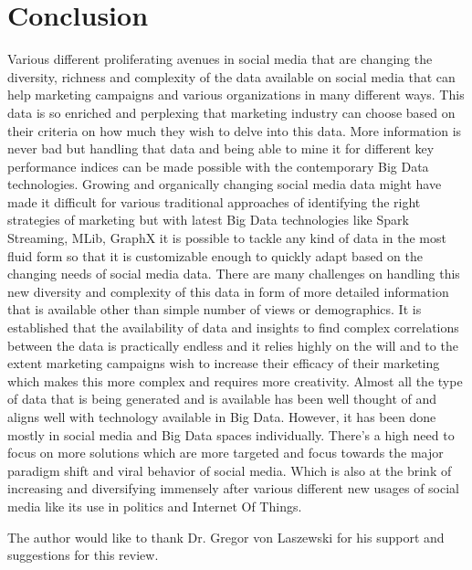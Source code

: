 \documentclass[sigconf]{acmart}
\begin{document}
\section{Conclusion}
Various different proliferating avenues in social media that are changing the diversity, richness and complexity of the data available on social media that can help marketing campaigns and various organizations in many different ways. This data is so enriched and perplexing that marketing industry can choose based on their criteria on how much they wish to delve into this data. More information is never bad but handling that data and being able to mine it for different key performance indices can be made possible with the contemporary Big Data technologies. Growing and organically changing social media data might have made it difficult for various traditional approaches of identifying the right strategies of marketing but with latest Big Data technologies like Spark Streaming, MLib, GraphX it is possible to tackle any kind of data in the most fluid form so that it is customizable enough to quickly adapt based on the changing needs of social media data. There are many challenges on handling this new diversity and complexity of this data in form of more detailed information that is available other than simple number of views or demographics. It is established that the availability of data and insights to find complex correlations between the data is practically endless and it relies highly on the will and to the extent marketing campaigns wish to increase their efficacy of their marketing which makes this more complex and requires more creativity. Almost all the type of data that is being generated and is available has been well thought of and aligns well with technology available in Big Data. However, it has been done mostly in social media and Big Data spaces individually. There's a high need to focus on more solutions which are more targeted and focus towards the major paradigm shift and viral behavior of social media. Which is also at the brink of increasing and diversifying immensely after various different new usages of social media like its use in politics and Internet Of Things.

\begin{acks}
The author would like to thank Dr. Gregor von Laszewski for his support and suggestions for this review.
\end{acks}


 
\end{document}
